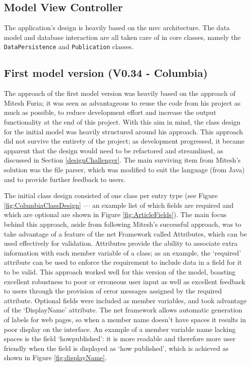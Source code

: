 \subsection{Model View Controller}
The application's design is heavily based on the \gls{mvc} architecture.  The data model and database interaction are all taken care of in core classes, namely the \texttt{DataPersistence} and \texttt{Publication} classes.

\subsection{First model version (V0.34 - Columbia)}
\label{columbia}
The approach of the first model version was heavily based on the approach of Mitesh Furia; it was seen as advantageous to reuse the code from his project as much as possible, to reduce development effort and increase the output functionality at the end of this project.  With this aim in mind, the class design for the initial model was heavily structured around his approach.  This approach did not survive the entirety of the project; as development progressed, it became apparent that the design would need to be refactored and streamlined, as discussed in Section \ref{designChallenger}.  The main surviving item from Mitesh's solution was the file parser, which was modified to suit the \cs{} language (from Java) and to provide further feedback to users.

The initial class design consisted of one class per entry type (see Figure \ref{fig:ColumbiaClassDesign} --- an example list of which fields are required and which are optional are shown in Figure \ref{fig:ArticleFields}).  The main focus behind this approach, aside from following Mitesh's successful approach, was to take advantage of a feature of the \gls{net} Framework called Attributes, which can be used effectively for validation.  Attributes provide the ability to associate extra information with each member variable of a class; as an example, the `required' attribute can be used to enforce the requirement to include data in a field for it to be valid.  This approach worked well for this version of the model, boasting excellent robustness to poor or erroneous user input as well as excellent feedback to users through the provision of error messages assigned by the required attribute.  Optional fields were included as member variables, and took advantage of the `DisplayName' attribute. The \gls{net} framework allows automatic generation of labels for web pages, so when a member name doesn't have spaces it results in poor display on the interface.  An example of a member variable name lacking spaces is the field `howpublished': it is more readable and therefore more user friendly when the field is displayed as `how published', which is achieved as shown in Figure \ref{fig:displayName}.

